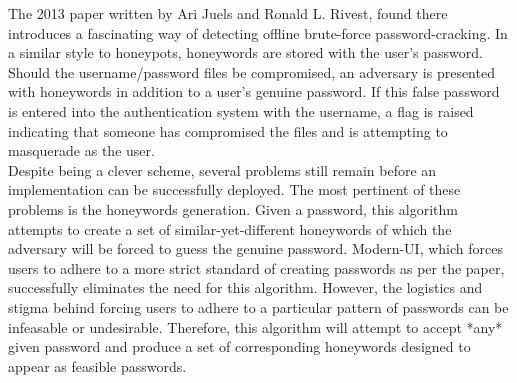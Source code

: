 The 2013 paper written by Ari Juels and Ronald L. Rivest, found  there%
introduces a fascinating way of detecting offline brute-force password-cracking. In a similar style to honeypots, honeywords are stored with the user's password. Should the username/password files be compromised, an adversary is presented with honeywords in addition to a user's genuine password. If this false password is entered into the authentication system with the username, a flag is raised indicating that someone has compromised the files and is attempting to masquerade as the user. \\

Despite being a clever scheme, several problems still remain before an implementation can be successfully deployed. The most pertinent of these problems is the honeywords generation. Given a password, this algorithm attempts to create a set of similar-yet-different honeywords of which the adversary will be forced to guess the genuine password. Modern-UI, which forces users to adhere to a more strict standard of creating passwords as per the paper, successfully eliminates the need for this algorithm. However, the logistics and stigma behind forcing users to adhere to a particular pattern of passwords can be infeasable or undesirable. Therefore, this algorithm will attempt to accept *any* given password and produce a set of corresponding honeywords designed to appear as feasible passwords.\\




